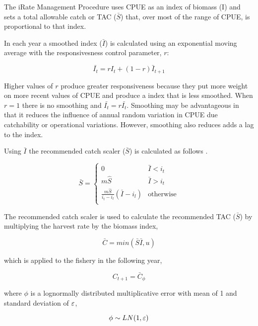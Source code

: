 The iRate Management Procedure uses CPUE as an index of biomass (I) and sets a total allowable catch or TAC ($\bar{S}$) that, over most of the range of CPUE, is proportional to that index.

In each year a smoothed index ($\bar{I}$) is calculated using an exponential moving average with the responsivesness control parameter, $r$:

\begin{equation}
\bar{I_t}=rI_t+(1-r)\bar{I}_{t+1}
\end{equation}


Higher values of $r$ produce greater responsiveness because they put more weight on more recent values of CPUE and produce a index that is less smoothed. When $r = 1$ there is no smoothing and $\bar{I_t}=r\bar{I_t}$.
Smoothing may be advantageous in that it reduces the influence of annual random variation in CPUE due catchability or operational variations. However, smoothing also reduces adds a lag to the index.

Using $\bar{I}$ the recommended catch scaler ($\bar{S}$) is calculated as follows	. 

 
\begin{equation}
\bar{S} = \left\{ \begin{array}{ll}
	0                   			  &\mbox{$\bar{I} < i_t$} \\
	m\hat{S}            			  &\mbox{$\bar{I} > i_t$} \\
	\frac{m\hat{S}}{i_t-i_l}(\bar{I}-i_l)     &\mbox{otherwise}\\
		  \end{array}
	  \right.
\end{equation}


The recommended catch scaler is used to calculate the recommended TAC ($\bar{S}$) by multiplying the harvest rate by the biomass index,

\begin{equation}
\bar{C}=min(\bar{S}\bar{I},u)
\end{equation}

which is applied to the fishery in the following year,

\begin{equation}
C_{t+1} = \bar{C}_\phi
\end{equation}

where $\phi$ is a lognormally distributed multiplicative error with mean of 1 and standard deviation of $\varepsilon$,

\begin{equation}
\phi \sim LN(1,\varepsilon)
\end{equation}

